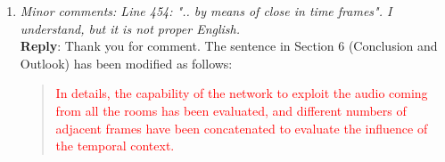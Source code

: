 \documentclass[11pt, technote, letterpaper, oneside, onecolumn]{IEEEtran}
\begin{document}
\begin{enumerate}

\item \textit{Minor comments: Line 454: ".. by means of close in time frames". I understand, but it is not proper English.\\}
\textbf{Reply}: Thank you for comment. The sentence in Section 6 (Conclusion and Outlook) has been modified as follows:
\begin{quote}
	\textcolor{red}{In details, the capability of the network to exploit the audio coming from all the rooms has been evaluated, and different numbers of adjacent frames have been concatenated to evaluate the influence of the temporal context.}
\end{quote}
\end{enumerate}

\newpage
\end{document}
